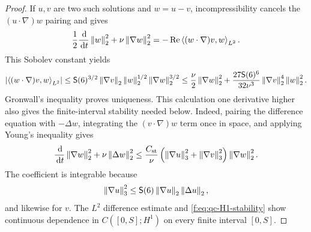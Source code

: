 \begin{proof}
If \(u,v\) are two such solutions and \(w=u-v\), incompressibility cancels
the \((u\cdot\nabla)w\) pairing and gives
\[
 \frac12\frac{\,\mathrm d}{\,\mathrm d t}\left\lVert w\right\rVert_2^2
 +\nu\left\lVert \nabla w\right\rVert_2^2
 =-\operatorname{Re}\left\langle (w\cdot\nabla)v,w\right\rangle_{L^2}.
\]
This Sobolev constant yields
\[
 \left|\left\langle (w\cdot\nabla)v,w\right\rangle_{L^2}\right|
 \le \mathsf S(6)^{3/2}\left\lVert \nabla v\right\rVert_2
       \left\lVert w\right\rVert_2^{1/2}\left\lVert \nabla w\right\rVert_2^{3/2}
 \le\frac\nu2\left\lVert \nabla w\right\rVert_2^2
 +\frac{27\mathsf S(6)^6}{32\nu^3}
  \left\lVert \nabla v\right\rVert_2^4\left\lVert w\right\rVert_2^2.
\]
Gronwall's inequality proves uniqueness.  This calculation one derivative
higher also gives the finite-interval stability needed below.  Indeed, pairing
the difference equation with \(-\Delta w\), integrating the
\((v\cdot\nabla)w\) term once in space, and applying Young's inequality gives
\begin{equation}
 \frac{\,\mathrm d}{\,\mathrm d t}\left\lVert \nabla w\right\rVert_2^2
 +\nu\left\lVert \Delta w\right\rVert_2^2
 \le \frac{C_{\rm st}}\nu
 \left(\left\lVert \nabla u\right\rVert_3^2+\left\lVert \nabla v\right\rVert_3^2\right)
 \left\lVert \nabla w\right\rVert_2^2.
 \label{f:eq:qc-H1-stability}
\end{equation}
The coefficient is integrable because
\[
 \left\lVert \nabla u\right\rVert_3^2
 \le \mathsf S(6)\left\lVert \nabla u\right\rVert_2\left\lVert \Delta u\right\rVert_2,
\]
and likewise for \(v\).  The \(L^2\) difference estimate and
\eqref{f:eq:qc-H1-stability} show continuous dependence in
\(C([0,S];H^1)\) on every finite interval \([0,S]\).


\end{proof}
